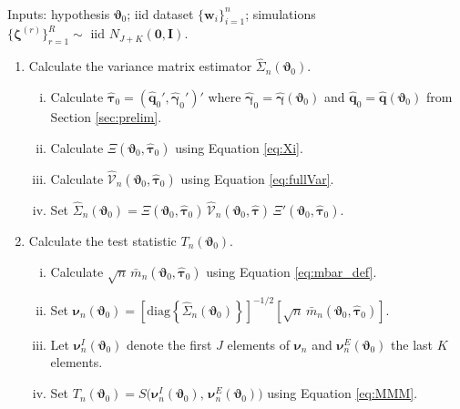 \begin{alg}
  \mbox{} \\
    Inputs: hypothesis $\boldsymbol{\vartheta}_0$; 
    iid dataset $\{\mathbf{w}_i\}_{i=1}^n$;
    simulations $\{\boldsymbol{\zeta}^{(r)}\}_{r=1}^R \sim \mbox{ iid } N_{J+K}(\mathbf{0}, \mathbf{I})$.
  \begin{enumerate}
    \item Calculate the variance matrix estimator $\widehat{\Sigma}_n(\boldsymbol{\vartheta}_0)$.
      \begin{enumerate}[(i)]
        \item Calculate $\widehat{\boldsymbol{\tau}}_0 = (\widehat{\mathbf{q}}_0', \widehat{\boldsymbol{\gamma}}_0')'$ where $\widehat{\boldsymbol{\gamma}}_0 =  \widehat{\boldsymbol{\gamma}}(\boldsymbol{\vartheta}_0)$ and $\widehat{\mathbf{q}}_0 =  \widehat{\mathbf{q}}(\boldsymbol{\vartheta}_0)$ from Section \ref{sec:prelim}.
        \item Calculate $\Xi(\boldsymbol{\vartheta}_0,\widehat{\boldsymbol{\tau}}_0)$ using Equation \ref{eq:Xi}.
        \item Calculate $\widehat{\mathcal{V}}_n(\boldsymbol{\vartheta}_0,\widehat{\boldsymbol{\tau}}_0)$ using Equation \ref{eq:fullVar}.
        \item Set $\widehat{\Sigma}_n(\boldsymbol{\vartheta}_0) = \Xi(\boldsymbol{\vartheta}_0, \widehat{\boldsymbol{\tau}}_0)\, \widehat{\mathcal{V}}_n(\boldsymbol{\vartheta}_0, \widehat{\boldsymbol{\tau}})\,\Xi'(\boldsymbol{\vartheta}_0, \widehat{\boldsymbol{\tau}}_0)$.
      \end{enumerate}
    \item Calculate the test statistic $T_n(\boldsymbol{\vartheta}_0)$.
      \begin{enumerate}[(i)]
        \item Calculate $\sqrt{n}\, \bar{m}_n(\boldsymbol{\vartheta}_0, \widehat{\boldsymbol{\tau}}_0)$ using Equation \ref{eq:mbar_def}.
        \item Set $\boldsymbol{\nu}_n(\boldsymbol{\vartheta}_0) = \left[ \mbox{diag}\left\{\widehat{\Sigma}_n(\boldsymbol{\vartheta}_0)\right\} \right]^{-1/2} \left[ \sqrt{n}\,\bar{m}_n(\boldsymbol{\vartheta}_0, \widehat{\boldsymbol{\tau}}_0) \right]$.
        \item Let $\boldsymbol{\nu}^I_n(\boldsymbol{\vartheta}_0)$ denote the first $J$ elements of $\boldsymbol{\nu}_n$ and  $\boldsymbol{\nu}_n^E(\boldsymbol{\vartheta}_0)$ the last $K$ elements.   
        \item Set $T_n(\boldsymbol{\vartheta}_0) = S\big( \boldsymbol{\nu}_n^I(\boldsymbol{\vartheta}_0),\,\boldsymbol{\nu}_n^E(\boldsymbol{\vartheta}_0) \big)$ using Equation \ref{eq:MMM}.

\end{enumerate}
\end{enumerate}
\end{alg}
